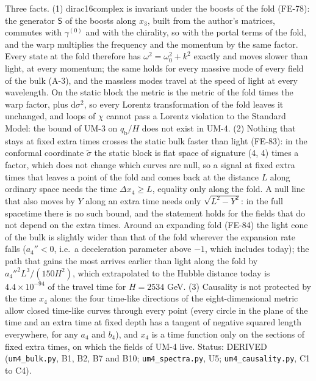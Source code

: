 \documentclass[
  10pt,
]{article}
\begin{document}
Three facts. (1) dirac16complex is invariant under the boosts of the
fold (FE-78): the generator \(\mathsf{S}\) of the boosts along \(x_3\),
built from the author's matrices, commutes with \(\gamma^{(0)}\) and
with the chirality, so with the portal terms of the fold, and the warp
multiplies the frequency and the momentum by the same factor. Every
state at the fold therefore has \(\omega^2 = \omega_0^2 + k^2\) exactly
and moves slower than light, at every momentum; the same holds for every
massive mode of every field of the bulk (A-3), and the massless modes
travel at the speed of light at every wavelength. On the static block
the metric is the metric of the fold times the warp factor, plus
\(\mathrm{d}\sigma^2\), so every Lorentz transformation of the fold
leaves it unchanged, and loops of \(\chi\) cannot pass a Lorentz
violation to the Standard Model: the bound of UM-3 on
\(q_{\mathrm{b}}/H\) does not exist in UM-4. (2) Nothing that stays at
fixed extra times crosses the static bulk faster than light (FE-83): in
the conformal coordinate \(\tilde\sigma\) the static block is flat space
of signature (4, 4) times a factor, which does not change which curves
are null, so a signal at fixed extra times that leaves a point of the
fold and comes back at the distance \(L\) along ordinary space needs the
time \(\Delta x_4 \ge L\), equality only along the fold. A null line
that also moves by \(Y\) along an extra time needs only
\(\sqrt{L^2 - Y^2}\): in the full spacetime there is no such bound, and
the statement holds for the fields that do not depend on the extra
times. Around an expanding fold (FE-84) the light cone of the bulk is
slightly wider than that of the fold wherever the expansion rate falls
(\(a_4'' < 0\), i.e.~a deceleration parameter above \(-1\), which
includes today); the path that gains the most arrives earlier than light
along the fold by \(a_4''^2L^3/(150H^2)\), which extrapolated to the
Hubble distance today is \(4.4\times10^{-94}\) of the travel time for
\(H = 2534\) GeV. (3) Causality is not protected by the time \(x_4\)
alone: the four time-like directions of the eight-dimensional metric
allow closed time-like curves through every point (every circle in the
plane of the time and an extra time at fixed depth has a tangent of
negative squared length everywhere, for any \(a_4\) and \(b_4\)), and
\(x_4\) is a time function only on the sections of fixed extra times, on
which the fields of UM-4 live. Status: DERIVED (\texttt{um4\_bulk.py},
B1, B2, B7 and B10; \texttt{um4\_spectra.py}, U5;
\texttt{um4\_causality.py}, C1 to C4).
\end{document}

